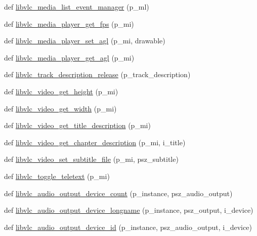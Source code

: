 \begin{DoxyCompactItemize}
\item 
def \hyperlink{namespacevlc_a624be8eb190ea1c0d3f6b275efaa736c}{libvlc\+\_\+media\+\_\+list\+\_\+event\+\_\+manager} (p\+\_\+ml)
\item 
def \hyperlink{namespacevlc_a29146dbf43a47a18afeb6834dcc3c51b}{libvlc\+\_\+media\+\_\+player\+\_\+get\+\_\+fps} (p\+\_\+mi)
\item 
def \hyperlink{namespacevlc_a71a776d5201caa9efb0f154678044ce7}{libvlc\+\_\+media\+\_\+player\+\_\+set\+\_\+agl} (p\+\_\+mi, drawable)
\item 
def \hyperlink{namespacevlc_a801a636edb9f5b1a8b3095f7feb10aa6}{libvlc\+\_\+media\+\_\+player\+\_\+get\+\_\+agl} (p\+\_\+mi)
\item 
def \hyperlink{namespacevlc_a7f44252e965f874e76b3c2f7a831d88d}{libvlc\+\_\+track\+\_\+description\+\_\+release} (p\+\_\+track\+\_\+description)
\item 
def \hyperlink{namespacevlc_a7c264d39e3dc764d025e7e8ae19017e9}{libvlc\+\_\+video\+\_\+get\+\_\+height} (p\+\_\+mi)
\item 
def \hyperlink{namespacevlc_a8f9436337022e7452520f9d626fe2be4}{libvlc\+\_\+video\+\_\+get\+\_\+width} (p\+\_\+mi)
\item 
def \hyperlink{namespacevlc_aff9b7b91e260510010e50e5fdf038bc1}{libvlc\+\_\+video\+\_\+get\+\_\+title\+\_\+description} (p\+\_\+mi)
\item 
def \hyperlink{namespacevlc_a5104946a600f435d5bc0493607457ea5}{libvlc\+\_\+video\+\_\+get\+\_\+chapter\+\_\+description} (p\+\_\+mi, i\+\_\+title)
\item 
def \hyperlink{namespacevlc_a51adbf5641c80acf9c96eb0a6395157b}{libvlc\+\_\+video\+\_\+set\+\_\+subtitle\+\_\+file} (p\+\_\+mi, psz\+\_\+subtitle)
\item 
def \hyperlink{namespacevlc_a02d8dbdfe4e01b1399fb964450fa557e}{libvlc\+\_\+toggle\+\_\+teletext} (p\+\_\+mi)
\item 
def \hyperlink{namespacevlc_ab26cd1fc475f71b8faa4e86f9c95ce21}{libvlc\+\_\+audio\+\_\+output\+\_\+device\+\_\+count} (p\+\_\+instance, psz\+\_\+audio\+\_\+output)
\item 
def \hyperlink{namespacevlc_a88c35604ea93344aaec29a2967e5ffa8}{libvlc\+\_\+audio\+\_\+output\+\_\+device\+\_\+longname} (p\+\_\+instance, psz\+\_\+output, i\+\_\+device)
\item 
def \hyperlink{namespacevlc_a058a41cbf5946ba44fdb114876c47d81}{libvlc\+\_\+audio\+\_\+output\+\_\+device\+\_\+id} (p\+\_\+instance, psz\+\_\+audio\+\_\+output, i\+\_\+device)
\item 

\end{DoxyCompactItemize}
